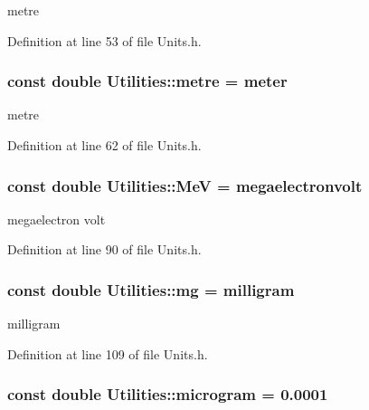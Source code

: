 metre 



Definition at line 53 of file Units.h.

\hypertarget{namespace_utilities_abf8ec967be8032f9546e417808f17cec}{
\subsubsection[{metre}]{\setlength{\rightskip}{0pt plus 5cm}const double {\bf Utilities::metre} = {\bf meter}}}
\label{namespace_utilities_abf8ec967be8032f9546e417808f17cec}


metre 



Definition at line 62 of file Units.h.

\hypertarget{namespace_utilities_a26374683c027fd82866b27124597f903}{
\subsubsection[{MeV}]{\setlength{\rightskip}{0pt plus 5cm}const double {\bf Utilities::MeV} = {\bf megaelectronvolt}}}
\label{namespace_utilities_a26374683c027fd82866b27124597f903}


megaelectron volt 



Definition at line 90 of file Units.h.

\hypertarget{namespace_utilities_a644a781a973f0febf71abf06c267c8f3}{
\subsubsection[{mg}]{\setlength{\rightskip}{0pt plus 5cm}const double {\bf Utilities::mg} = {\bf milligram}}}
\label{namespace_utilities_a644a781a973f0febf71abf06c267c8f3}


milligram 



Definition at line 109 of file Units.h.

\hypertarget{namespace_utilities_ab9752f0a0b8174ed273a2a505c2a83e4}{
\subsubsection[{microgram}]{\setlength{\rightskip}{0pt plus 5cm}const double {\bf Utilities::microgram} = 0.0001}}
\label{namespace_utilities_ab9752f0a0b8174ed273a2a505c2a83e4}


